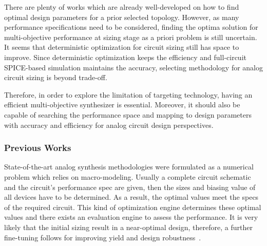       There are plenty of works which are already well-developed on how to find optimal design parameters for a prior selected topology. However, as many performance specifications need to be considered, finding the optima solution for multi-objective performance at sizing stage as a priori problem is still uncertain. It seems that deterministic optimization for circuit sizing still has space to improve. Since deterministic optimization keeps the efficiency and full-circuit SPICE-based simulation maintains the accuracy, selecting methodology for analog circuit sizing is beyond trade-off. 

      Therefore, in order to explore the limitation of targeting technology, having an efficient multi-objective synthesizer is essential. Moreover, it should also be capable of searching the performance space and mapping to design parameters with accuracy and efficiency for analog circuit design perspectives.

      \subsubsection{Previous Works}
        State-of-the-art analog synthesis methodologies were formulated as a numerical problem which relies on macro-modeling. Usually a complete circuit schematic and the circuit's performance spec are given, then the sizes and biasing value of all devices have to be determined. As a result, the optimal values meet the specs of the required circuit. This kind of optimization engine determines these optimal values and there exists an evaluation engine to assess the performance. It is very likely that the initial sizing result in a near-optimal design, therefore, a further fine-tuning follows for improving yield and design robustness~\cite{HierModeling_ProIEEE2007}. 

